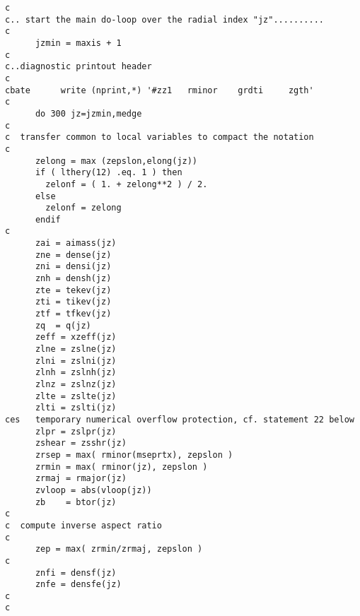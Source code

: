 \begin{verbatim}
c
c.. start the main do-loop over the radial index "jz"..........
c
      jzmin = maxis + 1
c
c..diagnostic printout header
c
cbate      write (nprint,*) '#zz1   rminor    grdti     zgth'
c
      do 300 jz=jzmin,medge
c
c  transfer common to local variables to compact the notation
c
      zelong = max (zepslon,elong(jz))
      if ( lthery(12) .eq. 1 ) then
        zelonf = ( 1. + zelong**2 ) / 2.
      else
        zelonf = zelong
      endif
c
      zai = aimass(jz)
      zne = dense(jz)
      zni = densi(jz)
      znh = densh(jz)
      zte = tekev(jz)
      zti = tikev(jz)
      ztf = tfkev(jz)
      zq  = q(jz)
      zeff = xzeff(jz)
      zlne = zslne(jz)
      zlni = zslni(jz)
      zlnh = zslnh(jz)
      zlnz = zslnz(jz)
      zlte = zslte(jz)
      zlti = zslti(jz)
ces   temporary numerical overflow protection, cf. statement 22 below
      zlpr = zslpr(jz)
      zshear = zsshr(jz)
      zrsep = max( rminor(mseprtx), zepslon )
      zrmin = max( rminor(jz), zepslon )
      zrmaj = rmajor(jz)
      zvloop = abs(vloop(jz))
      zb    = btor(jz)
c
c  compute inverse aspect ratio
c
      zep = max( zrmin/zrmaj, zepslon )
c
      znfi = densf(jz)
      znfe = densfe(jz)
c
c
\end{verbatim}


